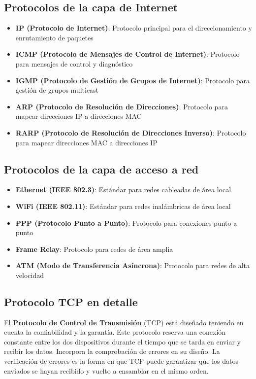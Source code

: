 \subsection{Protocolos de la capa de Internet}

\begin{itemize}
    \item \textbf{IP (Protocolo de Internet)}: Protocolo principal para el direccionamiento y enrutamiento de paquetes
    \item \textbf{ICMP (Protocolo de Mensajes de Control de Internet)}: Protocolo para mensajes de control y diagnóstico
    \item \textbf{IGMP (Protocolo de Gestión de Grupos de Internet)}: Protocolo para gestión de grupos multicast
    \item \textbf{ARP (Protocolo de Resolución de Direcciones)}: Protocolo para mapear direcciones IP a direcciones MAC
    \item \textbf{RARP (Protocolo de Resolución de Direcciones Inverso)}: Protocolo para mapear direcciones MAC a direcciones IP
\end{itemize}

\subsection{Protocolos de la capa de acceso a red}

\begin{itemize}
    \item \textbf{Ethernet (IEEE 802.3)}: Estándar para redes cableadas de área local
    \item \textbf{WiFi (IEEE 802.11)}: Estándar para redes inalámbricas de área local
    \item \textbf{PPP (Protocolo Punto a Punto)}: Protocolo para conexiones punto a punto
    \item \textbf{Frame Relay}: Protocolo para redes de área amplia
    \item \textbf{ATM (Modo de Transferencia Asíncrona)}: Protocolo para redes de alta velocidad
\end{itemize}

\subsection{Protocolo TCP en detalle}

El \textbf{Protocolo de Control de Transmisión} (TCP) está diseñado teniendo en cuenta la confiabilidad y la garantía. Este protocolo reserva una conexión constante entre los dos dispositivos durante el tiempo que se tarda en enviar y recibir los datos. Incorpora la comprobación de errores en su diseño. La verificación de errores es la forma en que TCP puede garantizar que los datos enviados se hayan recibido y vuelto a ensamblar en el mismo orden.


